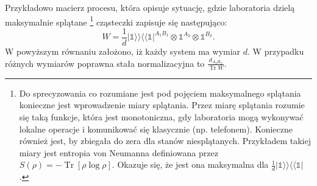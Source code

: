 \documentclass[10pt]{article} %
\DeclareMathOperator{\Trs}{Tr}
\newcommand{\Ket}[1]{|#1\rangle}
\newcommand{\Bra}[1]{\langle#1|}
\newcommand{\BBra}[1]{\langle\langle#1|}
\newcommand{\KKet}[1]{|#1\rangle\rangle}
\newcommand{\KP}{\Ket{\psi}}
\newcommand{\BP}{\Bra{\psi}}
\newcommand{\I}{\mathbb{1}}
\begin{document}
Przykładowo macierz procesu, która opisuje sytuację, gdzie laboratoria dzielą maksymalnie splątane
\footnote{Do sprecyzowania co rozumiane jest pod pojęciem maksymalnego splątania konieczne jest wprowadzenie miary splątania. Przez miarę splątania rozumie się taką funkcje, która jest monotoniczna, gdy laboratoria mogą wykonywać lokalne operacje i komunikować się klasycznie (np. telefonem). Konieczne również jest, by zbiegała do zera dla stanów niesplątanych. Przykładem takiej miary jest entropia von Neumanna definiowana przez $S(\rho) = -\Trs \left[ \rho \log \rho \right]$. Okazuje się, że jest ona maksymalna dla $\frac{1}{d}\KKet{\I}\BBra{\I}$ \cite{review}.
}
 cząsteczki zapisuje się następująco:
\begin{equation}
W = \frac{1}{d}\KKet{\I}\BBra{\I}^{A_1B_1} \otimes \I^{A_2} \otimes \I^{B_2}.
\end{equation} W powyższym równaniu założono, iż każdy system ma wymiar $d$. W przypadku różnych wymiarów poprawna stała normalizacyjna to $\frac{d_{A_2B_2}}{\Trs W}$.
\end{document}
